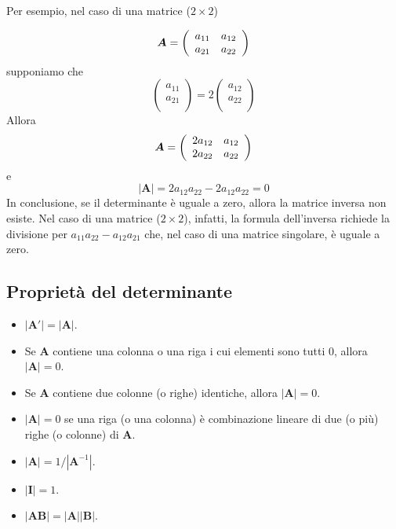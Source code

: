 Per esempio, nel caso di una matrice ($2 \times 2$)

\begin{displaymath}
\boldsymbol{A} =  \left( \begin{array}{c c}
a_{11}& a_{12} \\
a_{21} & a_{22} \end{array} \right)
\end{displaymath}
 supponiamo che
\[
\left(%
\begin{array}{c}
  a_{11} \\
  a_{21} \\
\end{array}%
\right)=2
\left(%
\begin{array}{c}
  a_{12} \\
  a_{22} \\
\end{array}%
\right)
\]
 Allora
\begin{displaymath}
\boldsymbol{A} =  \left( \begin{array}{c c}
2a_{12}& a_{12} \\
2a_{22} & a_{22} \end{array} \right)
\end{displaymath}
e
\[
 |\boldsymbol{A}| = 2a_{12}a_{22}-2a_{12}a_{22}=0
\]
 In conclusione, se il determinante {\`e} uguale a zero, allora
la matrice inversa non esiste.
 Nel caso di una matrice ($2 \times 2$), infatti, la formula
dell'inversa richiede la divisione per $a_{11}a_{22}-a_{12}a_{21}$
che, nel caso di una matrice singolare, {\`e} uguale a zero.

\subsection{Proprietà del determinante}

\begin{itemize}
    \item $|\boldsymbol{A}'| = |\boldsymbol{A}|$.
    \item Se $\boldsymbol{A}$ contiene una colonna o una riga i cui
    elementi sono tutti 0, allora $|\boldsymbol{A}|=0$.
    \item Se $\boldsymbol{A}$ contiene due colonne (o righe) identiche, allora $|\boldsymbol{A}|=0$.
    \item $|\boldsymbol{A}| = 0$ se una riga (o una colonna) {\`e} combinazione lineare di
    due (o pi{\`u}) righe (o colonne) di $\boldsymbol{A}$.
    \item $|\boldsymbol{A}| = 1/|\boldsymbol{A}^{-1}|$.
    \item $|\boldsymbol{I}| = 1$.
    \item $|\boldsymbol{A} \boldsymbol{B}| = |\boldsymbol{A}| |\boldsymbol{B}|$.

\end{itemize}

